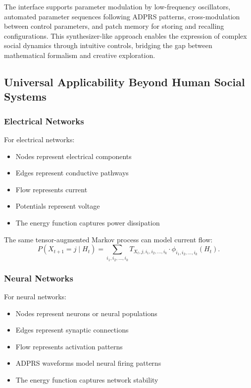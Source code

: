 \documentclass[11pt,a4paper]{article}
\begin{document}
The interface supports parameter modulation by low-frequency oscillators, automated parameter sequences following ADPRS patterns, cross-modulation between control parameters, and patch memory for storing and recalling configurations. This synthesizer-like approach enables the expression of complex social dynamics through intuitive controls, bridging the gap between mathematical formalism and creative exploration.

\subsection{Universal Applicability Beyond Human Social Systems}

\subsubsection{Electrical Networks}

For electrical networks:
\begin{itemize}
\item Nodes represent electrical components
\item Edges represent conductive pathways
\item Flow represents current
\item Potentials represent voltage
\item The energy function captures power dissipation
\end{itemize}

The same tensor-augmented Markov process can model current flow:
\begin{equation}
P(X_{t+1} = j \mid H_t) = \sum_{i_1,i_2,\ldots,i_k} T_{X_t,j,i_1,i_2,\ldots,i_k} \cdot \phi_{i_1,i_2,\ldots,i_k}(H_t).
\end{equation}

\subsubsection{Neural Networks}

For neural networks:
\begin{itemize}
\item Nodes represent neurons or neural populations
\item Edges represent synaptic connections
\item Flow represents activation patterns
\item ADPRS waveforms model neural firing patterns
\item The energy function captures network stability
\end{itemize}
\end{document}
